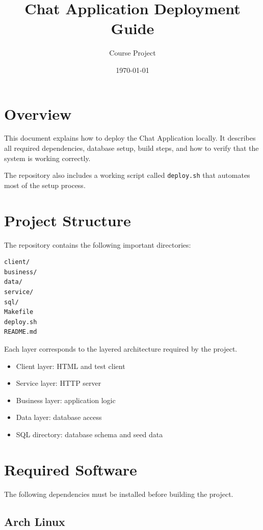 \documentclass[11pt]{article}
\title{Chat Application Deployment Guide}
\author{Course Project}
\date{\today}
\begin{document}
\maketitle

\section*{Overview}

This document explains how to deploy the Chat Application locally.
It describes all required dependencies, database setup, build steps,
and how to verify that the system is working correctly.

The repository also includes a working script called \texttt{deploy.sh}
that automates most of the setup process.

\section*{Project Structure}

The repository contains the following important directories:

\begin{verbatim}
client/
business/
data/
service/
sql/
Makefile
deploy.sh
README.md
\end{verbatim}

Each layer corresponds to the layered architecture required by the project.

\begin{itemize}
\item Client layer: HTML and test client
\item Service layer: HTTP server
\item Business layer: application logic
\item Data layer: database access
\item SQL directory: database schema and seed data
\end{itemize}

\section*{Required Software}

The following dependencies must be installed before building the project.

\subsection*{Arch Linux}
\end{document}
